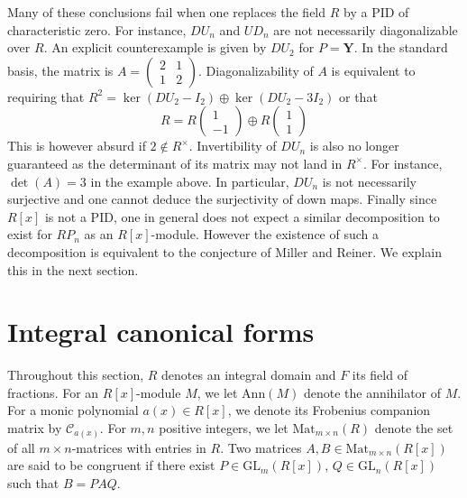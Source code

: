 \documentclass[11pt]{article}
\theoremstyle{definition}
\numberwithin{equation}{section}
\newcommand{\GL}{\mathrm{GL}}
\begin{document}
Many of  these conclusions fail when one replaces the field %
$ R $ by  a PID of characteristic zero. For instance, $  DU_{n} $ and $ UD_{n} $ are not necessarily diagonalizable over $ R $.  An explicit  counterexample is given by $ DU_{2} $ for $ P         =    \mathbf{Y}   $. In the standard basis, the matrix  is $ A = \left ( \begin{smallmatrix} 2  & 1  \\ 1  &  2          \end{smallmatrix}   \right ) $.   Diagonalizability of $ A $ is equivalent to requiring  that $ R^{2} =  \ker (DU_{2} - I_{2}) \oplus \ker ( DU_{2} - 3I_{2}) $ or that  
$$    R  =   R \left ( \begin{smallmatrix}    1 \\  - 1 \end{smallmatrix} \right ) \oplus  R \left ( \begin{smallmatrix} 1 \\  1  \end{smallmatrix} \right  )  $$
This is however absurd if $ 2 \notin R^{\times }$.  Invertibility of $ DU_{n} $ is also no longer guaranteed as the determinant of its matrix may not land in $ R^{\times} $.  For instance,  $ \det(A) = 3 $ in the example above. In particular, $ DU_{n} $ is not necessarily surjective and one cannot deduce the surjectivity of down maps.   Finally since $ R[x] $ is not a PID, one in general does not expect a similar decomposition to exist for $  R P_{n} $ %
as an $ R[x]$-module.  However the existence of such a decomposition is equivalent to the conjecture of Miller and Reiner. We explain this in the next section.                                                   


\section{Integral canonical forms}

Throughout this section,  $ R $ denotes an integral domain and $ F $ its field of fractions. For an $ R[x] $-module $ M $, we let  $ \mathrm{Ann}(M) $ denote  the annihilator of $ M $. For a monic polynomial $ a(x) \in R[x] $, we denote its Frobenius companion matrix by $  \mathcal{C}_{a(x)}  $. For $ m , n $ positive integers, we let $ \mathrm{Mat}_{m \times n }(R) $   denote the set of all $ m \times n $-matrices with entries in $ R $. Two matrices $ A , B \in \mathrm{Mat}_{m \times n }(R[x]) $ are said to be congruent if there exist $ P \in \GL_{m}(R[x]) $, $ Q \in \GL_{n}(R[x]) $ such that $ B =  P A Q $. 
\end{document}
